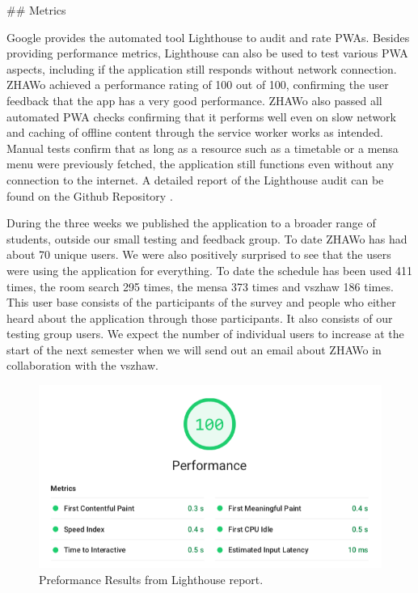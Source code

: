 \begin{markdown}
## Metrics

Google provides the automated tool Lighthouse \cite{Lighthouse} to audit and rate PWAs. Besides providing performance metrics, Lighthouse can also be used to test various PWA aspects, including if the application still responds without network connection. ZHAWo achieved a performance rating of 100 out of 100, confirming the user feedback that the app has a very good performance. ZHAWo also passed all automated PWA checks confirming that it performs well even on slow network and caching of offline content through the service worker works as intended. Manual tests confirm that as long as a resource such as a timetable or a mensa menu were previously fetched, the application still functions even without any connection to the internet. A detailed report of the Lighthouse audit can be found on the Github Repository \cite{OurGithub}.

During the three weeks we published the application to a broader range of students, outside our small testing and feedback group. To date ZHAWo has had about 70 unique users. We were also positively surprised to see that the users were using the application for everything. To date the schedule has been used 411 times, the room search 295 times, the mensa 373 times and vszhaw 186 times. This user base consists of the participants of the survey and people who either heard about the application through those participants. It also consists of our testing group users. We expect the number of individual users to increase at the start of the next semester when we will send out an email about ZHAWo in collaboration with the vszhaw.

\bigskip

\begin{figure}[H]
  \includegraphics[width=13cm, center]{../../metrics/ZHAWoLighthousereportBAPreformance.png}
  \captionsetup{width=15.5cm}
  \caption [Lighthouse Preformance]{Preformance Results from Lighthouse report.}
  \label{fig:LighthousePreformance}
\end{figure}

\newpage

\end{markdown}

